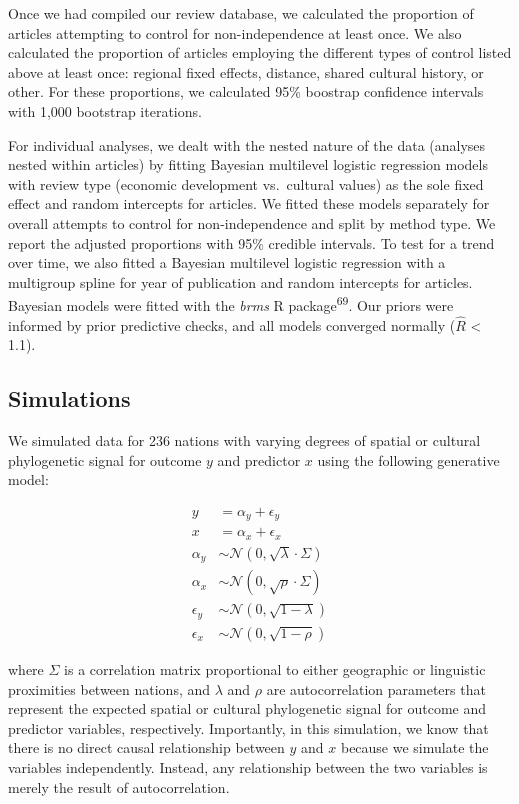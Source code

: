 \documentclass[english,man,floatsintext]{apa6}
\begin{document}
Once we had compiled our review database, we calculated the proportion of articles attempting to control for non-independence at least once. We also calculated the proportion of articles employing the different types of control listed above at least once: regional fixed effects, distance, shared cultural history, or other. For these proportions, we calculated 95\% boostrap confidence intervals with 1,000 bootstrap iterations.

For individual analyses, we dealt with the nested nature of the data (analyses nested within articles) by fitting Bayesian multilevel logistic regression models with review type (economic development vs.~cultural values) as the sole fixed effect and random intercepts for articles. We fitted these models separately for overall attempts to control for non-independence and split by method type. We report the adjusted proportions with 95\% credible intervals. To test for a trend over time, we also fitted a Bayesian multilevel logistic regression with a multigroup spline for year of publication and random intercepts for articles. Bayesian models were fitted with the \emph{brms} R package\textsuperscript{69}. Our priors were informed by prior predictive checks, and all models converged normally (\(\hat{R}\) \textless{} 1.1).

\hypertarget{simulations}{%
\subsection{Simulations}\label{simulations}}

We simulated data for 236 nations with varying degrees of spatial or cultural phylogenetic signal for outcome \(y\) and predictor \(x\) using the following generative model:

\[
\begin{aligned}
y &= \alpha_y + \epsilon_y \\
x &= \alpha_x + \epsilon_x \\
\alpha_y &\sim \mathcal{N}(0, \sqrt{\lambda} \cdot \Sigma) \\
\alpha_x &\sim \mathcal{N}(0, \sqrt{\rho} \cdot \Sigma) \\
\epsilon_y &\sim \mathcal{N}(0, \sqrt{1 - \lambda}) \\
\epsilon_x &\sim \mathcal{N}(0, \sqrt{1 - \rho})
\end{aligned}
\]

where \(\Sigma\) is a correlation matrix proportional to either geographic or linguistic proximities between nations, and \(\lambda\) and \(\rho\) are autocorrelation parameters that represent the expected spatial or cultural phylogenetic signal for outcome and predictor variables, respectively. Importantly, in this simulation, we know that there is no direct causal relationship between \(y\) and \(x\) because we simulate the variables independently. Instead, any relationship between the two variables is merely the result of autocorrelation.
\end{document}
